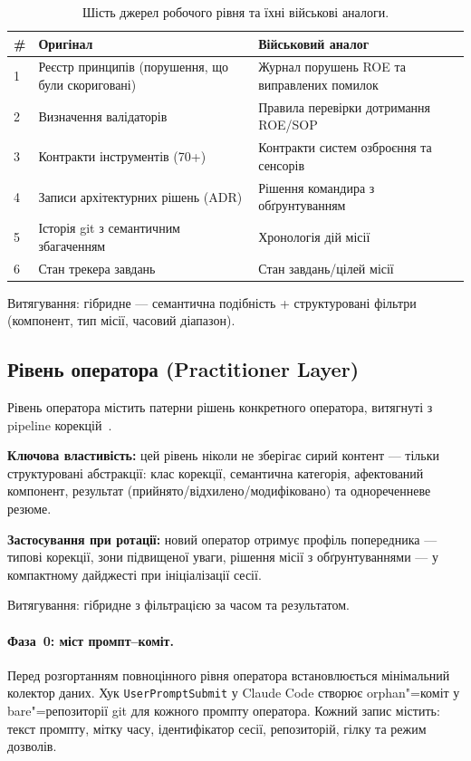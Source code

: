 \documentclass[11pt]{article}
\begin{document}
\begin{table}[ht]
\centering
\caption{Шість джерел робочого рівня та їхні військові аналоги.}
\label{tab:workflow-mapping}
\begin{tabular}{@{}lp{4.5cm}p{4.5cm}@{}}
\toprule
\textbf{\#} & \textbf{Оригінал} & \textbf{Військовий аналог} \\
\midrule
1 & Реєстр принципів (порушення, що були скориговані) & Журнал порушень ROE та виправлених помилок \\
2 & Визначення валідаторів & Правила перевірки дотримання ROE/SOP \\
3 & Контракти інструментів (70+) & Контракти систем озброєння та сенсорів \\
4 & Записи архітектурних рішень (ADR) & Рішення командира з обґрунтуванням \\
5 & Історія git з семантичним збагаченням & Хронологія дій місії \\
6 & Стан трекера завдань & Стан завдань/цілей місії \\
\bottomrule
\end{tabular}
\end{table}

Витягування: гібридне --- семантична подібність + структуровані фільтри (компонент, тип місії, часовий діапазон).

\subsection{Рівень оператора (Practitioner Layer)}

Рівень оператора містить патерни рішень конкретного оператора, витягнуті з pipeline корекцій~\citep{ovcharov2026edittrace}.

\textbf{Ключова властивість:} цей рівень ніколи не зберігає сирий контент --- тільки структуровані абстракції: клас корекції, семантична категорія, афектований компонент, результат (прийнято/відхилено/модифіковано) та однореченневе резюме.

\textbf{Застосування при ротації:} новий оператор отримує профіль попередника --- типові корекції, зони підвищеної уваги, рішення місії з обґрунтуваннями --- у компактному дайджесті при ініціалізації сесії.

Витягування: гібридне з фільтрацією за часом та результатом.

\paragraph{Фаза~0: міст промпт--коміт.}
Перед розгортанням повноцінного рівня оператора встановлюється мінімальний колектор даних.
Хук \texttt{UserPromptSubmit} у Claude Code створює orphan"=коміт у bare"=репозиторії git для кожного промпту оператора.
Кожний запис містить: текст промпту, мітку часу, ідентифікатор сесії, репозиторій, гілку та режим дозволів.
\end{document}
